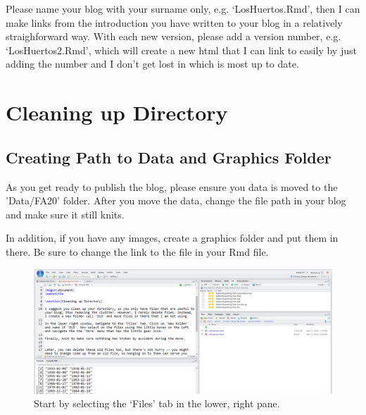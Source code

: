 \documentclass{article}\usepackage[]{graphicx}\usepackage[]{color}
\begin{document}
Please name your blog with your surname only, e.g. `LosHuertos.Rmd', then I can make links from the introduction you have written to your blog in a relatively straighforward way. With each new version, please add a version number, e.g. `LosHuertos2.Rmd', which will create a new html that I can link to easily by just adding the number and I don't get lost in which is most up to date. 






\section{Cleaning up Directory}

\subsection{Creating Path to Data and Graphics Folder}

As you get ready to publish the blog, please ensure you data is moved to the 'Data/FA20' folder. After you move the data, change the file path in your blog and make sure it still knits. 

In addition, if you have any images, create a graphics folder and put them in there. Be sure to change the link to the file in your Rmd file.

\begin{figure}
\includegraphics[width=\textwidth]{FourWindows}
\caption{Start by selecting the `Files' tab in the lower, right pane.}
\end{figure}
\end{document}
